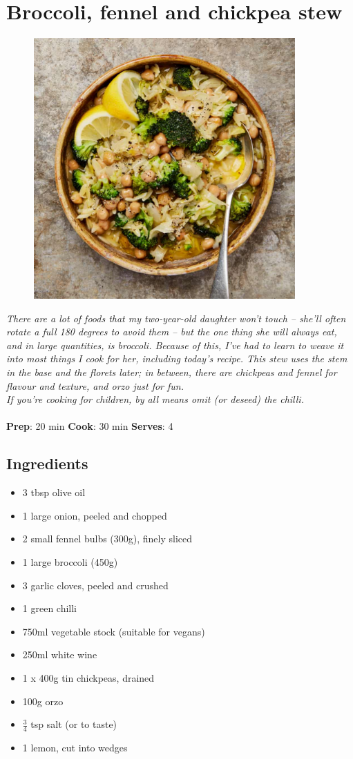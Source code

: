 \documentclass{book}
\begin{document}
\section{Broccoli, fennel and chickpea stew}
\begin{figure}
\centering\includegraphics[width=10cm,height=10cm,keepaspectratio]{Recipe_Pictures/Broccoli,_fennel_and_chickpea_stew.png}
\end{figure}
\emph{There are a lot of foods that my two-year-old daughter won’t touch – she’ll often rotate a full 180 degrees to avoid them – but the one thing she will always eat, and in large quantities, is broccoli. Because of this, I’ve had to learn to weave it into most things I cook for her, including today’s recipe. This stew uses the stem in the base and the florets later; in between, there are chickpeas and fennel for flavour and texture, and orzo just for fun.\\ 
If you’re cooking for children, by all means omit (or deseed) the chilli.}\\\\ 
\textbf{Prep}: 20 min
\textbf{Cook}: 30 min
\textbf{Serves}: 4
\subsection*{Ingredients}
\begin{itemize}
\item 3 tbsp olive oil 
\item 1 large onion, peeled and chopped 
\item 2 small fennel bulbs (300g), finely sliced 
\item 1 large broccoli (450g) 
\item 3 garlic cloves, peeled and crushed 
\item 1 green chilli 
\item 750ml vegetable stock (suitable for vegans) 
\item 250ml white wine 
\item 1 x 400g tin chickpeas, drained 
\item 100g orzo 
\item $\frac{3}{4}$ tsp salt (or to taste) 
\item 1 lemon, cut into wedges
\end{itemize}
\end{document}
